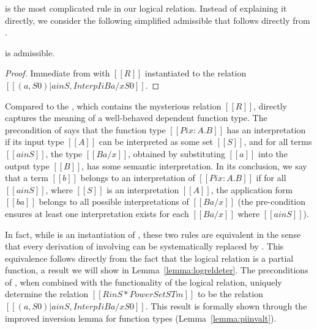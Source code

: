 \documentclass[acmsmall,screen=true,
\ifpublic review=false\else,review=true\fi
  ,anonymous=\ifanonymous true\else false\fi]{acmart}
\begin{document}
 is the most complicated rule in our logical
relation. Instead of explaining it directly, we consider the following
simplified admissible  that follows directly from .
\begin{center}
\end{center}
\begin{lemma}
  \label{lemma:piintroalt}
   is admissible.
\end{lemma}
\begin{proof}
Immediate from  with $[[R]]$ instantiated to the relation $[[{ (a
, S0 ) | a in S , Interp I i B { a /x } S0 }]]$.
\end{proof}
Compared to the , which contains the mysterious relation
$[[R]]$,  directly captures the meaning of
a well-behaved dependent function type. The precondition of
 says that
the function type $[[Pi x : A . B]]$ has an interpretation if its input
type $[[A]]$ can be
interpreted as some set $[[S]]$, and for all terms $[[a in S]]$, the
type $[[B {a / x}]]$, obtained by substituting $[[a]]$ into the output type
$[[B]]$, has some semantic interpretation. In its conclusion, we say
that a term $[[b]]$ belongs to an interpretation of $[[Pi x : A . B]]$ if
for all $[[a in S]]$, where $[[S]]$ is an interpretation $[[A]]$, the
application form $[[b a]]$ belongs to all possible interpretations of
$[[B {a  / x}]]$ (the pre-condition ensures at least one interpretation
exists for each $[[B {a / x}]]$ where $[[a in S]]$).

In fact, while  is an instantiation of ,
these two rules are equivalent in the sense that every derivation of
involving  can be systematically replaced by
. This equivalence follows directly from the fact
that the logical relation is a partial function, a result we will show
in Lemma~\ref{lemma:logreldeter}. The preconditions of ,
when combined with the functionality of the logical relation, uniquely
determine the relation $[[R in S * PowerSet STm]]$ to be the relation
$[[{ (a , S0 ) | a in S , Interp I  i B { a /x } S0 }]]$. This result is
formally shown through the improved inversion lemma for function types
(Lemma~\ref{lemma:piinvalt}).
\end{document}
